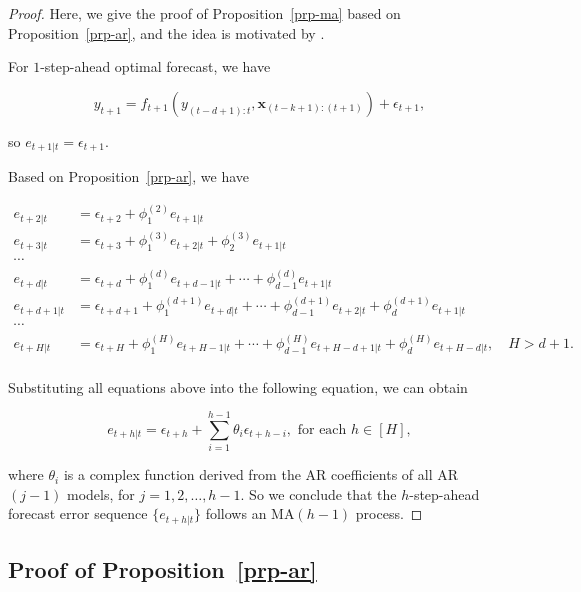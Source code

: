 \documentclass[
  11pt,
  a4paper,
]{article}
\theoremstyle{plain}
\theoremstyle{remark}
\begin{document}
\begin{proof}
Here, we give the proof of Proposition~\ref{prp-ma} based on
Proposition~\ref{prp-ar}, and the idea is motivated by
\textcite{sommer2023}.

For \(1\)-step-ahead optimal forecast, we have

\[
y_{t+1} = f_{t+1}(y_{(t-d+1):t},\bm{x}_{(t-k+1):(t+1)}) + \epsilon_{t+1},
\]

so \(e_{t+1|t}=\epsilon_{t+1}\).

Based on Proposition~\ref{prp-ar}, we have

\[
\begin{aligned}
e_{t+2|t} &= \epsilon_{t+2} + \phi_{1}^{(2)}e_{t+1|t} \\
e_{t+3|t} &= \epsilon_{t+3} + \phi_{1}^{(3)}e_{t+2|t} + \phi_{2}^{(3)}e_{t+1|t} \\
\cdots \\
e_{t+d|t} &= \epsilon_{t+d} + \phi_{1}^{(d)}e_{t+d-1|t} + \cdots + \phi_{d-1}^{(d)}e_{t+1|t} \\
e_{t+d+1|t} &= \epsilon_{t+d+1} + \phi_{1}^{(d+1)}e_{t+d|t} + \cdots + \phi_{d-1}^{(d+1)}e_{t+2|t} + \phi_{d}^{(d+1)}e_{t+1|t} \\
\cdots \\
e_{t+H|t} &= \epsilon_{t+H} + \phi_{1}^{(H)}e_{t+H-1|t} + \cdots + \phi_{d-1}^{(H)}e_{t+H-d+1|t} + \phi_{d}^{(H)}e_{t+H-d|t}, \quad H > d + 1. \\
\end{aligned}
\]

Substituting all equations above into the following equation, we can
obtain

\[
e_{t+h|t} = \epsilon_{t+h} + \sum_{i=1}^{h-1}\theta_{i}\epsilon_{t+h-i}, \text{ for each } h\in[H],
\]

where \(\theta_{i}\) is a complex function derived from the AR
coefficients of all AR\((j-1)\) models, for \(j = 1,2,\ldots,h-1\). So
we conclude that the \(h\)-step-ahead forecast error sequence
\(\{e_{t+h|t}\}\) follows an MA\((h-1)\) process.
\end{proof}

\subsection{\texorpdfstring{Proof of
Proposition~\ref{prp-ar}}{Proof of Proposition~}}\label{sec-proof_ar}
\end{document}
